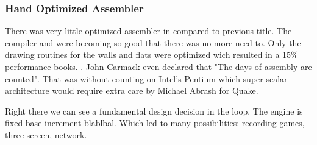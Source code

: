 \par


\subsubsection{Hand Optimized Assembler}
There was very little optimized assembler in \doom compared to previous title. The compiler and  were becoming so good that there was no more need to. Only the drawing routines for the walls and flats were optimized wich resulted in a 15\% performance books. . John Carmack even declared that "The days of assembly are counted". That was without counting on Intel's Pentium which super-scalar architecture would require extra care by Michael Abrash for Quake.



Right there we can see a fundamental design decision in the loop. The engine is fixed base increment blablbal. Which led to many possibilities: recording games, three screen, network.
